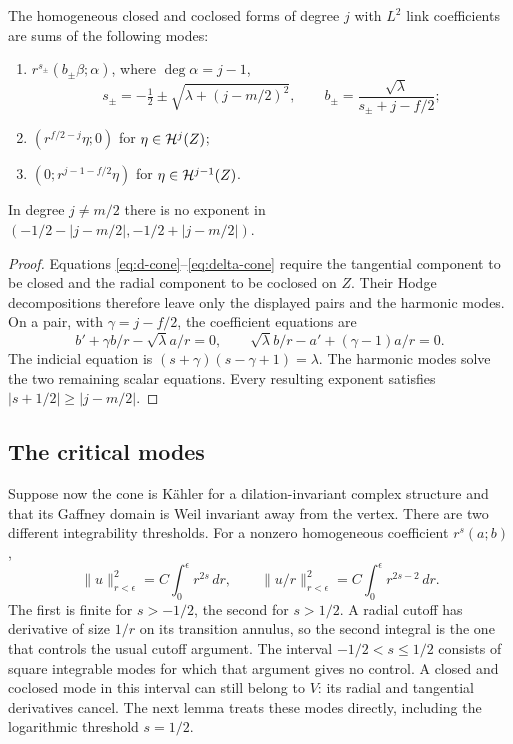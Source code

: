 \begin{lemma}\label{lem:indicial}
The homogeneous closed and coclosed forms of degree $j$ with
$L^2$ link coefficients are sums of the following modes:
\begin{enumerate}
\item $r^{s_\pm}(b_\pm\beta;\alpha)$, where
$\deg\alpha=j-1$,
\[
 s_\pm=-\tfrac12\pm\sqrt{\lambda+(j-m/2)^2},\qquad
 b_\pm=\frac{\sqrt\lambda}{s_\pm+j-f/2};
\]
\item $(r^{f/2-j}\eta;0)$ for $\eta\in\mathcal H^j(Z)$;
\item $(0;r^{j-1-f/2}\eta)$ for $\eta\in\mathcal H^{j-1}(Z)$.
\end{enumerate}
In degree $j\ne m/2$ there is no exponent in
$(-1/2-|j-m/2|,-1/2+|j-m/2|)$.
\end{lemma}
\begin{proof}
Equations \eqref{eq:d-cone}--\eqref{eq:delta-cone} require the
tangential component to be closed and the radial component to be
coclosed on $Z$. Their Hodge decompositions therefore leave only
the displayed pairs and the harmonic modes. On a pair, with
$\gamma=j-f/2$, the coefficient equations are
\[
 b'+\gamma b/r-\sqrt\lambda a/r=0,\qquad
 \sqrt\lambda b/r-a'+(\gamma-1)a/r=0.
\]
The indicial equation is $(s+\gamma)(s-\gamma+1)=\lambda$.
The harmonic modes solve the two remaining scalar equations.
Every resulting exponent satisfies $|s+1/2|\ge|j-m/2|$.
\end{proof}

\subsection{The critical modes}
Suppose now the cone is K\"ahler for a dilation-invariant complex
structure and that its Gaffney domain is Weil invariant away from
the vertex. There are two different integrability thresholds.
For a nonzero homogeneous coefficient $r^s(a;b)$,
\[
 \|u\|_{r<\epsilon}^2=C\int_0^\epsilon r^{2s}\,dr,
 \qquad
 \|u/r\|_{r<\epsilon}^2=C\int_0^\epsilon r^{2s-2}\,dr.
\]
The first is finite for $s>-1/2$, the second for $s>1/2$.
A radial cutoff has derivative of size $1/r$ on its transition
annulus, so the second integral is the one that controls the
usual cutoff argument. The interval $-1/2<s\le1/2$ consists
of square integrable modes for which that argument gives no
control. A closed and coclosed mode in this interval can still
belong to $V$: its radial and tangential derivatives cancel.
The next lemma treats these modes directly, including the
logarithmic threshold $s=1/2$.

